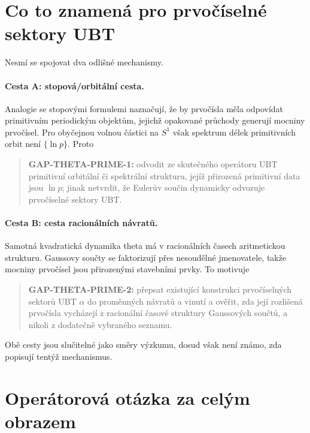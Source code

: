 \section{Co to znamená pro prvočíselné sektory UBT}

Nesmí se spojovat dva odlišné mechanismy.

\paragraph{Cesta A: stopová/orbitální cesta.}
Analogie se stopovými formulemi naznačují, že by prvočísla měla odpovídat
primitivním periodickým objektům, jejichž opakované průchody generují mocniny
prvočísel. Pro obyčejnou volnou částici na $S^1$ však spektrum délek
primitivních orbit není $\{\ln p\}$. Proto
\begin{quote}
\textbf{GAP-THETA-PRIME-1:} odvodit ze skutečného operátoru UBT primitivní
orbitální či spektrální strukturu, jejíž přirozená primitivní data jsou
$\ln p$; jinak netvrdit, že Eulerův součin dynamicky odvozuje prvočíselné
sektory UBT.
\end{quote}

\paragraph{Cesta B: cesta racionálních návratů.}
Samotná kvadratická dynamika theta má v racionálních časech aritmetickou
strukturu. Gaussovy součty se faktorizují přes nesoudělné jmenovatele, takže
mocniny prvočísel jsou přirozenými stavebními prvky. To motivuje
\begin{quote}
\textbf{GAP-THETA-PRIME-2:} přepsat existující konstrukci prvočíselných sektorů
UBT $\alpha$ do proměnných návratů a vinutí a ověřit, zda její rozlišená
prvočísla vycházejí z racionální časové struktury Gaussových součtů, a nikoli
z dodatečně vybraného seznamu.
\end{quote}

Obě cesty jsou slučitelné jako směry výzkumu, dosud však není známo, zda
popisují tentýž mechanismus.

\section{Operátorová otázka za celým obrazem}

